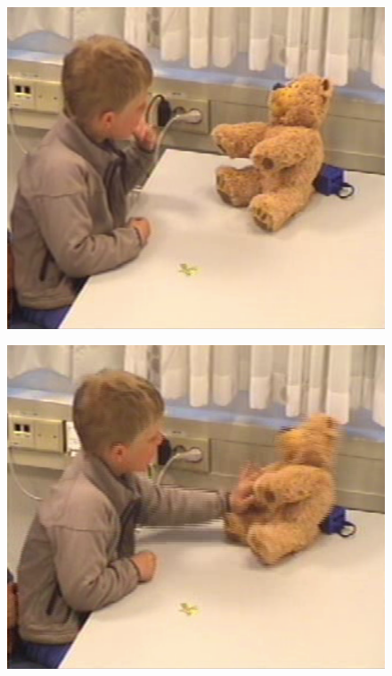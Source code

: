 \clearpage{}

\begin{figure}
	\begin{minipage}[t]{0.3\linewidth}
		\centering
			\includegraphics[width=0.20\paperwidth]{Pictures/usability-pictures/knockout1.png}
		\label{fig:child-knockout1}
	\end{minipage}
	\hspace{0.5cm}
	\begin{minipage}[t]{0.3\linewidth}
		\centering
			\includegraphics[width=0.20\paperwidth]{Pictures/usability-pictures/knockout2.png}

\end{minipage}
\end{figure}
